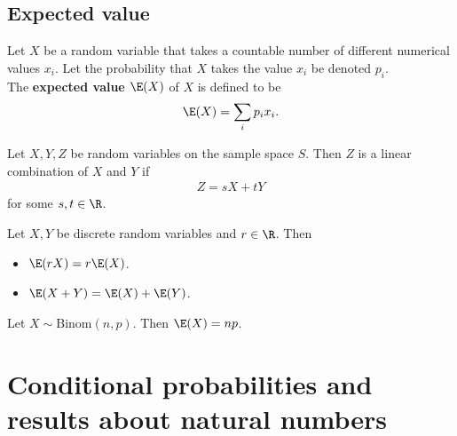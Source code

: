 \documentclass{article}
\begin{document}
\subsection{Expected value}
\begin{definition}
    Let $X$ be a random variable that takes a countable number of different
    numerical values $x_i$. Let the probability that $X$ takes the value $x_i$
    be denoted $p_i$.\\
    The \textbf{expected value $\E(X)$} of $X$ is defined to be
    \begin{align*}
        \E(X) = \sum_i p_i x_i.
    \end{align*}
\end{definition}
\begin{definition}
    Let $X,Y,Z$ be random variables on the sample space $S$.
    Then $Z$ is a linear combination of $X$ and $Y$ if
    \begin{align*}
        Z = sX + tY
    \end{align*}
    for some $s,t\in\R$.
\end{definition}
\begin{theorem}
    Let $X,Y$ be discrete random variables and $r\in\R$. Then
    \begin{itemize}
        \item $\E(rX)=r\E(X)$.
        \item $\E(X + Y) = \E(X) + \E(Y)$.
    \end{itemize}
\end{theorem}
\begin{proposition}
    Let $X\sim\text{Binom}(n,p)$. Then $\E(X)=np$.
\end{proposition}
\section{Conditional probabilities and results about natural numbers}
\end{document}

